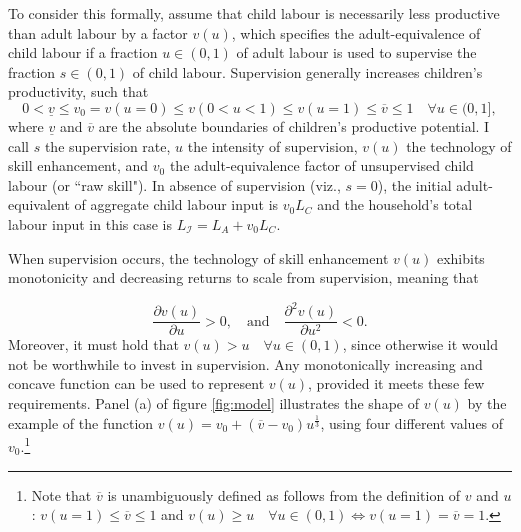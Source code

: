 \documentclass[a4paper,12pt]{article}
\theoremstyle{plain}
\theoremstyle{definition}
\theoremstyle{definition}
\theoremstyle{definition}
\theoremstyle{definition}
\begin{document}
To consider this formally, assume that child labour is necessarily less productive than adult labour by a factor $v(u)$, which specifies the adult-equivalence of child labour if a fraction $u\in (0,1)$ of adult labour is used to supervise the fraction $s\in (0,1)$ of child labour. Supervision generally increases children's productivity, such that
$$0< \underline{v}\leq v_0 = v(u=0)\leq v(0<u<1) \leq v(u=1)\leq\overline{v}\leq 1 \quad \forall u \in (0,1],$$
where $\underline{v}$ and $\overline{v}$ are the absolute boundaries of children's productive potential. I call $s$ the supervision rate, $u$ the intensity of supervision, $v(u)$ the technology of skill enhancement, and $v_0$ the adult-equivalence factor of unsupervised child labour (or ``raw skill"). In absence of supervision (viz., $s=0$), the initial adult-equivalent of aggregate child labour input is $v_0 L_C$ and the household's total labour input in this case is $L_{\mathcal{I}}=L_A + v_0 L_C$.

When supervision occurs, the technology of skill enhancement $v(u)$ exhibits monotonicity and decreasing returns to scale from supervision, meaning that

$$\frac{\partial v(u)}{\partial u}>0, \quad \text{and} \quad \frac{\partial^2 v(u)}{\partial u^2} < 0.$$
Moreover, it must hold that $v(u) > u \quad \forall u \in (0,1)$, since otherwise it would not be worthwhile to invest in supervision. Any monotonically increasing and concave function can be used to represent $v(u)$, provided it meets these few requirements. Panel (a) of figure \ref{fig:model} illustrates the shape of $v(u)$ by the example of the function $v(u)=v_0+(\overline{v}-v_0)u^{\frac{1}{3}}$, using four different values of $v_0$.\footnote{Note that $\overline{v}$ is unambiguously defined as follows from the definition of $v$ and $u$: $v(u=1)\leq\overline{v}\leq 1$ and $v(u)\geq u \quad \forall u \in (0,1) \iff v(u=1)=\overline{v}=1$.}
\end{document}
